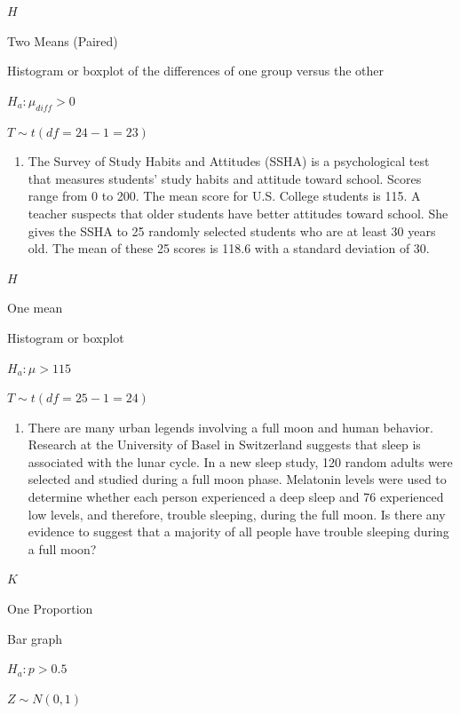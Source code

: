 \documentclass[]{article}
\providecommand{\tightlist}{%
  \setlength{\itemsep}{0pt}\setlength{\parskip}{0pt}}
\newenvironment{tight_enumerate}{ \begin{enumerate}[A)] \setlength{\itemsep}{0pt} \setlength{\parskip}{0pt}}{\end{enumerate}}
\begin{document}
\begin{tight_enumerate}
  \item $H$
  \item Two Means (Paired)
  \item Histogram or boxplot of the differences of one group versus the other
  \item $H_a: \mu_{diff} > 0$
  \item $T \sim t(df = 24 - 1 = 23)$
\end{tight_enumerate}

\begin{enumerate}
\def\labelenumi{\arabic{enumi}.}
\setcounter{enumi}{1}
\tightlist
\item
  The Survey of Study Habits and Attitudes (SSHA) is a psychological
  test that measures students' study habits and attitude toward school.
  Scores range from 0 to 200. The mean score for U.S. College students
  is 115. A teacher suspects that older students have better attitudes
  toward school. She gives the SSHA to 25 randomly selected students who
  are at least 30 years old. The mean of these 25 scores is 118.6 with a
  standard deviation of 30.
\end{enumerate}

\begin{tight_enumerate}
  \item $H$
  \item One mean
  \item Histogram or boxplot
  \item $H_a: \mu > 115$
  \item $T \sim t(df = 25 - 1 = 24)$
\end{tight_enumerate}

\begin{enumerate}
\def\labelenumi{\arabic{enumi}.}
\setcounter{enumi}{2}
\tightlist
\item
  There are many urban legends involving a full moon and human behavior.
  Research at the University of Basel in Switzerland suggests that sleep
  is associated with the lunar cycle. In a new sleep study, 120 random
  adults were selected and studied during a full moon phase. Melatonin
  levels were used to determine whether each person experienced a deep
  sleep and 76 experienced low levels, and therefore, trouble sleeping,
  during the full moon. Is there any evidence to suggest that a majority
  of all people have trouble sleeping during a full moon?
\end{enumerate}

\begin{tight_enumerate}
  \item $K$
  \item One Proportion
  \item Bar graph
  \item $H_a: p > 0.5$
  \item $Z \sim N(0, 1)$
\end{tight_enumerate}
\end{document}
